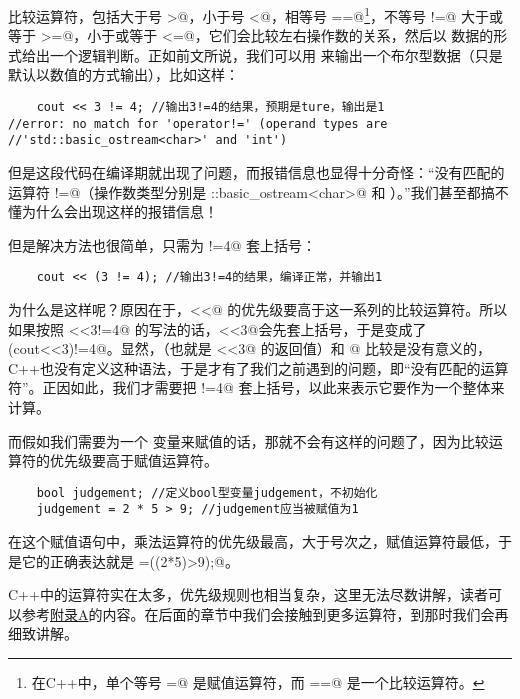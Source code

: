 比较运算符，包括大于号 \lstinline@>@，小于号 \lstinline@<@，相等号 \lstinline@==@\footnote{在C++中，单个等号 \lstinline@=@ 是赋值运算符，而 \lstinline@==@ 是一个比较运算符。}，不等号 \lstinline@!=@ 大于或等于 \lstinline@>=@，小于或等于 \lstinline@<=@，它们会比较左右操作数的关系，然后以 \lstinline@bool@ 数据的形式给出一个逻辑判断。正如前文所说，我们可以用 \lstinline@cout@ 来输出一个布尔型数据（只是默认以数值的方式输出），比如这样：
\begin{lstlisting}
    cout << 3 != 4; //输出3!=4的结果，预期是ture，输出是1
//error: no match for 'operator!=' (operand types are
//'std::basic_ostream<char>' and 'int')
\end{lstlisting}
但是这段代码在编译期就出现了问题，而报错信息也显得十分奇怪：``没有匹配的运算符 \lstinline@!=@（操作数类型分别是 \lstinline@std::basic_ostream<char>@ 和 \lstinline@int@）。''我们甚至都搞不懂为什么会出现这样的报错信息！\par
但是解决方法也很简单，只需为 !=4@ 套上括号：
\begin{lstlisting}
    cout << (3 != 4); //输出3!=4的结果，编译正常，并输出1
\end{lstlisting}\par
为什么是这样呢？原因在于，\lstinline@<<@ 的优先级要高于这一系列的比较运算符。所以如果按照 \lstinline@cout<<3!=4@ 的写法的话，\lstinline@cout<<3@会先套上括号，于是变成了 \lstinline@(cout<<3)!=4@。显然，\lstinline@cout@（也就是 \lstinline@cout<<3@ 的返回值）和 @ 比较是没有意义的，C++也没有定义这种语法，于是才有了我们之前遇到的问题，即``没有匹配的运算符''。正因如此，我们才需要把 !=4@ 套上括号，以此来表示它要作为一个整体来计算。\par
而假如我们需要为一个 \lstinline@bool@ 变量来赋值的话，那就不会有这样的问题了，因为比较运算符的优先级要高于赋值运算符。\par
\begin{lstlisting}
    bool judgement; //定义bool型变量judgement，不初始化
    judgement = 2 * 5 > 9; //judgement应当被赋值为1
\end{lstlisting}
在这个赋值语句中，乘法运算符的优先级最高，大于号次之，赋值运算符最低，于是它的正确表达就是 \lstinline@judgement=((2*5)>9);@。\par
C++中的运算符实在太多，优先级规则也相当复杂，这里无法尽数讲解，读者可以参考\hyperref[ch:appendix_A]{附录A}的内容。在后面的章节中我们会接触到更多运算符，到那时我们会再细致讲解。\par
